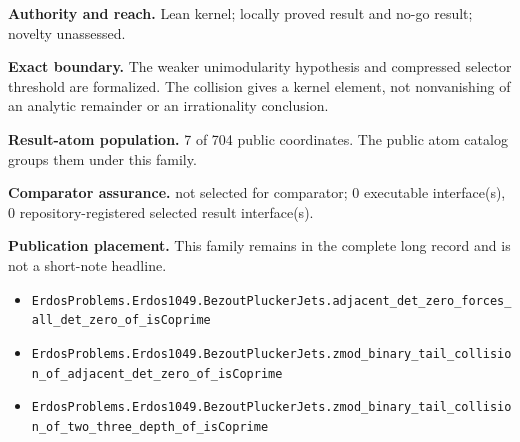 \documentclass[11pt]{article}
\begin{document}
\textbf{Authority and reach.} Lean kernel; locally proved result and no-go result; novelty unassessed.

\textbf{Exact boundary.} The weaker unimodularity hypothesis and compressed selector threshold are formalized. The collision gives a kernel element, not nonvanishing of an analytic remainder or an irrationality conclusion.

\textbf{Result-atom population.} 7 of 704 public coordinates. The public atom catalog groups them under this family.

\textbf{Comparator assurance.} not selected for comparator; 0 executable interface(s), 0 repository-registered selected result interface(s).

\textbf{Publication placement.} This family remains in the complete long record and is not a short-note headline.

\begin{itemize}
  \item \nolinkurl{ErdosProblems.Erdos1049.BezoutPluckerJets.adjacent_det_zero_forces_all_det_zero_of_isCoprime}
  \item \nolinkurl{ErdosProblems.Erdos1049.BezoutPluckerJets.zmod_binary_tail_collision_of_adjacent_det_zero_of_isCoprime}
  \item \nolinkurl{ErdosProblems.Erdos1049.BezoutPluckerJets.zmod_binary_tail_collision_of_two_three_depth_of_isCoprime}
\end{itemize}
\end{document}
